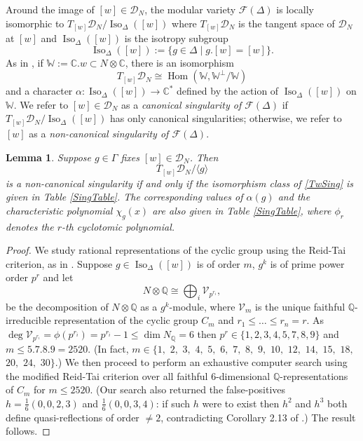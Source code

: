 \documentclass[12pt, a4paper]{article}
\newtheorem{lemma}[thm]{Lemma}
\newcommand{\CC}{\mathbb{C}}
\newcommand{\QQ}{\mathbb{Q}}
\newcommand{\WW}{\mathbb{W}}
\newcommand{\la}{\langle}
\newcommand{\ra}{\rangle}
\newcommand{\dc}{\mathcal{D}}
\newcommand{\fc}{\mathcal{F}}
\newcommand{\vc}{\mathcal{V}}
\newcommand{\opn}{\operatorname}
\begin{document}
Around the image of $[w] \in \dc_N$, the modular variety $\fc(\Delta)$ is locally isomorphic to $T_{[w]} \dc_N / \opn{Iso}_{\Delta}([w])$ where $T_{[w]} \dc_N$ is the tangent space of $\dc_N$ at $[w]$ and $\opn{Iso}_{\Delta}([w])$ is the isotropy subgroup
\[ 
\opn{Iso}_{\Delta}([w]) := \{ g \in \Delta \mid g.[w] = [w] \}.
\]
As in \cite{GHSK3}, if $\WW:= \CC.w \subset N \otimes \CC$, there is an isomorphism
\begin{equation*}T_{[w]} \dc_N \cong \opn{Hom}(\WW, \WW^{\perp}/\WW)
\end{equation*}
and a character $\alpha:\opn{Iso}_{\Delta}([w]) \rightarrow \CC^*$ defined by the action of $\opn{Iso}_{\Delta}([w])$ on $\WW$.
We refer to $[w] \in \dc_N$ as a \emph{canonical singularity of $\fc(\Delta)$} if $T_{[w]} \dc_N/ \opn{Iso}_{\Delta}([w])$ has only canonical singularities; otherwise, we refer to $[w]$ as a  \emph{non-canonical singularity of $\fc(\Delta)$}.
\begin{lemma}\label{NCOM4}
  Suppose $g \in \Gamma$ fixes $[w] \in \dc_N$.
  Then
  \begin{equation}\label{TwSing}
    T_{[w]} \dc_N / \la g \ra
  \end{equation}
  is a non-canonical singularity if and only if the isomorphism class of \eqref{TwSing} is given in Table \ref{SingTable}. 
  The corresponding values of $\alpha(g)$ and the characteristic polynomial $\chi_g(x)$ are also given in Table \ref{SingTable}, where $\phi_r$ denotes the $r$-th cyclotomic polynomial.
\end{lemma}
\begin{proof}
  We study rational representations of the cyclic group using the Reid-Tai criterion, as in \cite{Kondo, GHSK3}.
Suppose $g \in \opn{Iso}_{\Delta}([w])$ is of order $m$,
  $g^k$ is of prime power order $p^r$
  and let  
  \[
  N \otimes \QQ \cong \bigoplus_i \vc_{p^{r_i}},
  \]
  be the decomposition of $N \otimes \QQ$ as a $g^k$-module, where $\vc_m$ is the unique faithful $\QQ$-irreducible representation of the cyclic group $C_m$ \cite{SerreLin} and $r_1 \leq \ldots \leq r_n=r$.
  As $\opn{deg} \vc_{p^{r_i}} = \phi(p^{r_i}) = p^{r_i}-1 \leq \opn{dim} N_{\QQ} = 6$ then $p^r \in \{1,2,3,4,5,7,8,9\}$ and $m \leq 5.7.8.9 = 2520$.
  (In fact, $m \in  \{1,$ $2,$ $3,$ $4,$ $5,$ $6,$ $7,$ $8,$ $9,$ $10,$ $12,$ $14,$ $15,$ $18,$ $20,$ $24,$ $30\}$.)
  We then proceed to perform an exhaustive computer search using the modified Reid-Tai criterion over all faithful 6-dimensional $\QQ$-representations of $C_m$ for $m \leq 2520$.
  (Our search also returned the false-positives
  $h= \frac{1}{6}(0,0,2,3)$
  and
  $\frac{1}{6}(0,0,3,4)$:
  if such $h$ were to exist then $h^2$ and $h^3$ both define quasi-reflections  of order $\neq 2$, contradicting Corollary 2.13 of \cite{GHSK3}.) 
  The result follows.
\end{proof}
\end{document}

